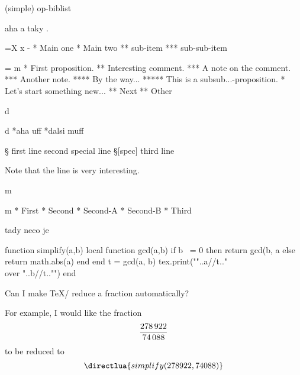 \fcread (simple) op-biblist

aha \fullcite[texbook] a taky \fullcite[Cmej].

\TEST \easylist

\everylist={\ifcase\ilevel\or \style X \or \style x \else \style - \fi}
\begitems \easylist
* Main one
* Main two
** sub-item
*** sub-sub-item
\enditems

\everylist={}
\begitems \easylist \style m \keepstyle
* First proposition.
** Interesting comment.
*** A note on the comment.
*** Another note.
**** By the way...
***** This is a subsub...-proposition.
* Let’s start something new...
** Next
** Other
\enditems

\TEST \style d

\begitems \style d
*{aha} uff \lipsum[3]
*{dalsi} muff \lipsum[4.1]
\enditems

\lipsum[2]

\TEST \ttlineref

\begtt \ttlineref §
first line
   second special line §[spec]
   third line
\endtt

Note that the line \lref[spec] is very interesting.

\TEST \style m

\begitems \style m \keepstyle  %
* First                        %
* Second                       %
  \begitems
  * Second-A                   %
  * Second-B                   %
  \enditems
* Third                        %
\enditems

\TEST \scaleto



\TEST \begfile \createfile \endfile

\endfile

  tady neco je
\endfile

\TEST \beglua \endlua

\beglua
function simplify(a,b)     
  local function gcd(a,b)   
    if b ~= 0 then
        return gcd(b, a %
    else
        return math.abs(a)
    end
  end
  t = gcd(a, b)
  tex.print("{"..a//t.."\\over "..b//t.."}")
end
\endlua
\def\simplify#1#2{\directlua{simplify(#1,#2)}}

Can I make \TeX/ reduce a fraction automatically?

For example, I would like the fraction
$$
  {278\,922\over 74\,088}
$$
to be reduced to
$$
  \simplify{278922}{74088}
$$

